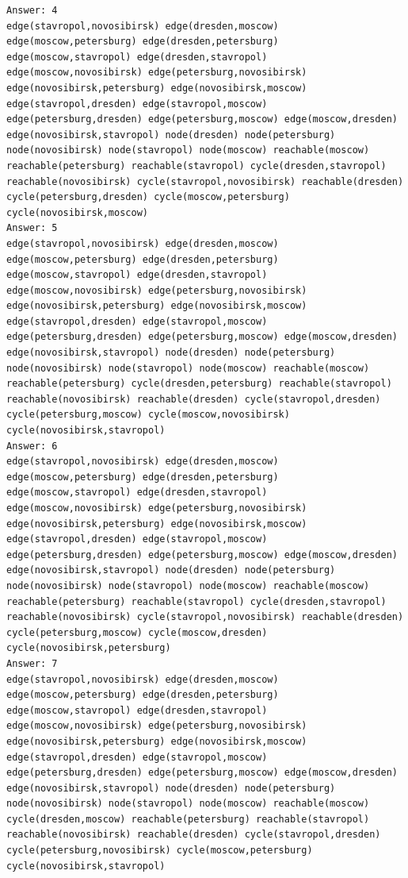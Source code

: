 \documentclass[dvipdfmx]{jsarticle}
\begin{document}
\begin{itemize}
\begin{verbatim}
Answer: 4
edge(stavropol,novosibirsk) edge(dresden,moscow) edge(moscow,petersburg) edge(dresden,petersburg) edge(moscow,stavropol) edge(dresden,stavropol) edge(moscow,novosibirsk) edge(petersburg,novosibirsk) edge(novosibirsk,petersburg) edge(novosibirsk,moscow) edge(stavropol,dresden) edge(stavropol,moscow) edge(petersburg,dresden) edge(petersburg,moscow) edge(moscow,dresden) edge(novosibirsk,stavropol) node(dresden) node(petersburg) node(novosibirsk) node(stavropol) node(moscow) reachable(moscow) reachable(petersburg) reachable(stavropol) cycle(dresden,stavropol) reachable(novosibirsk) cycle(stavropol,novosibirsk) reachable(dresden) cycle(petersburg,dresden) cycle(moscow,petersburg) cycle(novosibirsk,moscow)
Answer: 5
edge(stavropol,novosibirsk) edge(dresden,moscow) edge(moscow,petersburg) edge(dresden,petersburg) edge(moscow,stavropol) edge(dresden,stavropol) edge(moscow,novosibirsk) edge(petersburg,novosibirsk) edge(novosibirsk,petersburg) edge(novosibirsk,moscow) edge(stavropol,dresden) edge(stavropol,moscow) edge(petersburg,dresden) edge(petersburg,moscow) edge(moscow,dresden) edge(novosibirsk,stavropol) node(dresden) node(petersburg) node(novosibirsk) node(stavropol) node(moscow) reachable(moscow) reachable(petersburg) cycle(dresden,petersburg) reachable(stavropol) reachable(novosibirsk) reachable(dresden) cycle(stavropol,dresden) cycle(petersburg,moscow) cycle(moscow,novosibirsk) cycle(novosibirsk,stavropol)
Answer: 6
edge(stavropol,novosibirsk) edge(dresden,moscow) edge(moscow,petersburg) edge(dresden,petersburg) edge(moscow,stavropol) edge(dresden,stavropol) edge(moscow,novosibirsk) edge(petersburg,novosibirsk) edge(novosibirsk,petersburg) edge(novosibirsk,moscow) edge(stavropol,dresden) edge(stavropol,moscow) edge(petersburg,dresden) edge(petersburg,moscow) edge(moscow,dresden) edge(novosibirsk,stavropol) node(dresden) node(petersburg) node(novosibirsk) node(stavropol) node(moscow) reachable(moscow) reachable(petersburg) reachable(stavropol) cycle(dresden,stavropol) reachable(novosibirsk) cycle(stavropol,novosibirsk) reachable(dresden) cycle(petersburg,moscow) cycle(moscow,dresden) cycle(novosibirsk,petersburg)
Answer: 7
edge(stavropol,novosibirsk) edge(dresden,moscow) edge(moscow,petersburg) edge(dresden,petersburg) edge(moscow,stavropol) edge(dresden,stavropol) edge(moscow,novosibirsk) edge(petersburg,novosibirsk) edge(novosibirsk,petersburg) edge(novosibirsk,moscow) edge(stavropol,dresden) edge(stavropol,moscow) edge(petersburg,dresden) edge(petersburg,moscow) edge(moscow,dresden) edge(novosibirsk,stavropol) node(dresden) node(petersburg) node(novosibirsk) node(stavropol) node(moscow) reachable(moscow) cycle(dresden,moscow) reachable(petersburg) reachable(stavropol) reachable(novosibirsk) reachable(dresden) cycle(stavropol,dresden) cycle(petersburg,novosibirsk) cycle(moscow,petersburg) cycle(novosibirsk,stavropol)

\end{verbatim}
\end{itemize}
\end{document}
